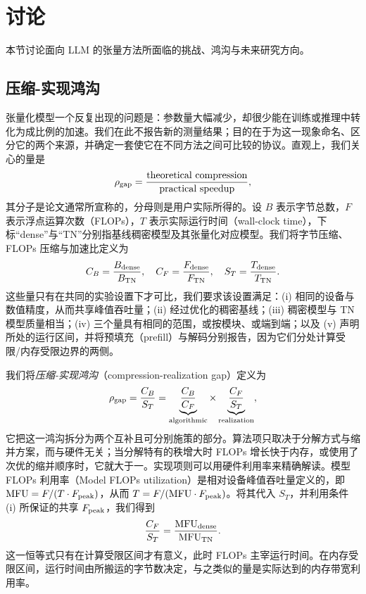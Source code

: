 \section{讨论}
\label{sec:future-directions}
本节讨论面向 LLM 的张量方法所面临的挑战、鸿沟与未来研究方向。

\subsection{压缩-实现鸿沟}
张量化模型一个反复出现的问题是：参数量大幅减少，却很少能在训练或推理中转化为成比例的加速。我们在此不报告新的测量结果；目的在于为这一现象命名、区分它的两个来源，并确定一套使它在不同方法之间可比较的协议。直观上，我们关心的量是
\begin{equation*}
  \rho_{\rm gap} = \frac{\text{theoretical compression}}{\text{practical speedup}},
\end{equation*}
其分子是论文通常所宣称的，分母则是用户实际所得的。设 $B$ 表示字节总数，$F$ 表示浮点运算次数（FLOPs），$T$ 表示实际运行时间（wall-clock time），下标``dense''与``TN''分别指基线稠密模型及其张量化对应模型。我们将字节压缩、FLOPs 压缩与加速比定义为
\begin{equation}
  C_B = \frac{B_{\rm dense}}{B_{\rm TN}}, \quad
  C_F = \frac{F_{\rm dense}}{F_{\rm TN}}, \quad
  S_T = \frac{T_{\rm dense}}{T_{\rm TN}}.
\end{equation}
这些量只有在共同的实验设置下才可比，我们要求该设置满足：(i) 相同的设备与数值精度，从而共享峰值吞吐量；(ii) 经过优化的稠密基线；(iii) 稠密模型与 TN 模型质量相当；(iv) 三个量具有相同的范围，或按模块、或端到端；以及 (v) 声明所处的运行区间，并将预填充（prefill）与解码分别报告，因为它们分处计算受限/内存受限边界的两侧。

我们将\emph{压缩-实现鸿沟}（compression-realization gap）定义为
\begin{equation}
  \rho_{\rm gap} = \frac{C_B}{S_T}
  = \underbrace{\frac{C_B}{C_F}}_{\text{algorithmic}} \times
    \underbrace{\frac{C_F}{S_T}}_{\text{realization}},
  \label{eq:rho-gap}
\end{equation}
它把这一鸿沟拆分为两个互补且可分别施策的部分。算法项只取决于分解方式与缩并方案，而与硬件无关；当分解特有的秩增大时 FLOPs 增长快于内存，或使用了次优的缩并顺序时，它就大于一。实现项则可以用硬件利用率来精确解读。模型 FLOPs 利用率（Model FLOPs utilization）是相对设备峰值吞吐量定义的，即 $\mathrm{MFU} = F / (T \cdot F_{\rm peak})$，从而 $T = F / (\mathrm{MFU} \cdot F_{\rm peak})$。将其代入 $S_T$，并利用条件 (i) 所保证的共享 $F_{\rm peak}$，我们得到
\begin{equation}
  \frac{C_F}{S_T} = \frac{\mathrm{MFU}_{\rm dense}}{\mathrm{MFU}_{\rm TN}}.
\end{equation}
这一恒等式只有在计算受限区间才有意义，此时 FLOPs 主宰运行时间。在内存受限区间，运行时间由所搬运的字节数决定，与之类似的量是实际达到的内存带宽利用率。

